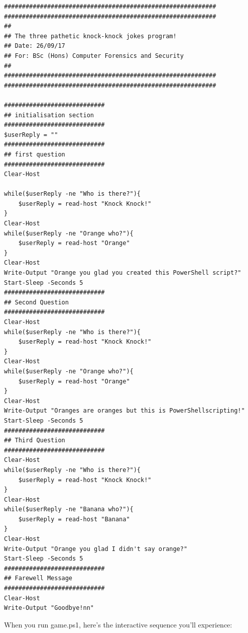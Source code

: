 \documentclass[a4paper]{article}
\begin{document}
\begin{verbatim}
###########################################################
###########################################################
##
## The three pathetic knock-knock jokes program!
## Date: 26/09/17
## For: BSc (Hons) Computer Forensics and Security
##
###########################################################
###########################################################

############################
## initialisation section
############################
$userReply = ""
############################
## first question
############################
Clear-Host

while($userReply -ne "Who is there?"){
    $userReply = read-host "Knock Knock!"
}
Clear-Host
while($userReply -ne "Orange who?"){
    $userReply = read-host "Orange"
}
Clear-Host
Write-Output "Orange you glad you created this PowerShell script?"
Start-Sleep -Seconds 5
############################
## Second Question
############################
Clear-Host
while($userReply -ne "Who is there?"){
    $userReply = read-host "Knock Knock!"
}
Clear-Host
while($userReply -ne "Orange who?"){
    $userReply = read-host "Orange"
}
Clear-Host
Write-Output "Oranges are oranges but this is PowerShellscripting!"
Start-Sleep -Seconds 5
############################
## Third Question
############################
Clear-Host
while($userReply -ne "Who is there?"){
    $userReply = read-host "Knock Knock!"
}
Clear-Host
while($userReply -ne "Banana who?"){
    $userReply = read-host "Banana"
}
Clear-Host
Write-Output "Orange you glad I didn't say orange?"
Start-Sleep -Seconds 5
############################
## Farewell Message
############################
Clear-Host
Write-Output "Goodbye!nn"    
\end{verbatim}
When you run game.ps1, here’s the interactive sequence you’ll experience:
\end{document}
